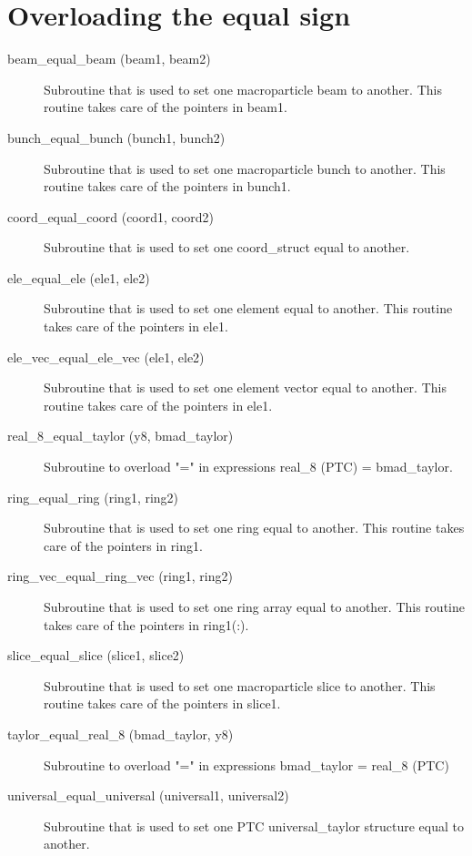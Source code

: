 \section{Overloading the equal sign}
\label{r:equal}    

\begin{description}

\item[beam\_equal\_beam (beam1, beam2)] \Newline
Subroutine that is used to set one macroparticle beam to another. This routine
takes care of the pointers in beam1.

\item[bunch\_equal\_bunch (bunch1, bunch2)] \Newline
Subroutine that is used to set one macroparticle bunch to another. This routine
takes care of the pointers in bunch1.

\item[coord\_equal\_coord (coord1, coord2)] \Newline
Subroutine that is used to set one coord\_struct equal to another. 

\item[ele\_equal\_ele (ele1, ele2)] \Newline
Subroutine that is used to set one element equal to another. 
This routine takes care of the pointers in ele1. 

\item[ele\_vec\_equal\_ele\_vec (ele1, ele2)] \Newline
Subroutine that is used to set one element vector equal to another. 
This routine takes care of the pointers in ele1. 

\item[real\_8\_equal\_taylor (y8, bmad\_taylor)] \Newline
Subroutine to overload "=" in expressions real\_8 (PTC) = bmad\_taylor.

\item[ring\_equal\_ring (ring1, ring2)] \Newline
Subroutine that is used to set one ring equal to another. 
This routine takes care of the pointers in ring1. 

\item[ring\_vec\_equal\_ring\_vec (ring1, ring2)] \Newline
Subroutine that is used to set one ring array equal to another. 
This routine takes care of the pointers in ring1(:). 

\item[slice\_equal\_slice (slice1, slice2)] \Newline
Subroutine that is used to set one macroparticle slice to another. This routine
takes care of the pointers in slice1.

\item[taylor\_equal\_real\_8 (bmad\_taylor, y8)] \Newline
Subroutine to overload "=" in expressions bmad\_taylor = real\_8 (PTC) 

\item[universal\_equal\_universal (universal1, universal2)] \Newline
Subroutine that is used to set one PTC universal\_taylor 
structure equal to another. 

\end{description}

